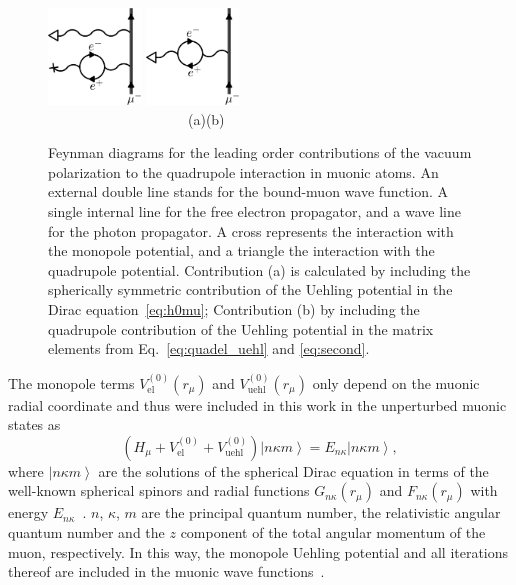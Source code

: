 \begin{figure}[b]
\centering
\includegraphics[width=0.22\textwidth]{pics/mixed}\hspace{3.5cm}
\includegraphics[width=0.22\textwidth]{pics/quehl}\\
$\qquad\qquad\qquad\qquad\qquad$(a)\hfill(b)$\qquad\qquad\qquad\qquad\qquad$
\caption{
Feynman diagrams for the leading order contributions of the vacuum polarization to the quadrupole interaction in muonic atoms. An external double line stands for the bound-muon wave function. A single internal line for the free electron propagator, and a wave line for the photon propagator. A cross represents the interaction with the monopole potential, and a triangle the interaction with the quadrupole potential. Contribution (a) is calculated by including the spherically symmetric contribution of the Uehling potential in the Dirac equation~\eqref{eq:h0mu}; Contribution (b) by including the quadrupole contribution of the Uehling potential in the matrix elements from Eq.~\eqref{eq:quadel_uehl} and \eqref{eq:second}.
}
\label{fig:quehl}
\end{figure}
%
%

The monopole terms $V^{(0)}_{\text{el}}(r_\mu)$ and $V^{(0)}_{\text{uehl}}(r_\mu)$ only depend on the muonic radial coordinate and thus were included in this work in the unperturbed muonic states as
\begin{equation}
\left( H_\mu + V^{(0)}_{\text{el}}+V^{(0)}_{\text{uehl}}\right) \left|n\kappa m\right> = E_{n\kappa}\left|n\kappa m \right>,
\label{eq:h0mu}
\end{equation}
where $\left|n\kappa m \right>$ are the solutions of the spherical Dirac equation in terms of the well-known spherical spinors and radial functions $G_{n\kappa}(r_\mu)$ and $F_{n\kappa}(r_\mu)$ with energy $E_{n \kappa}$~\cite{greiner2000}. $n$, $\kappa$, $m$ are the principal quantum number, the relativistic angular quantum number and the $z$ component of the total angular momentum of the muon, respectively. In this way, the monopole Uehling potential and all iterations thereof are included in the muonic wave functions~\cite{michel2017}.
